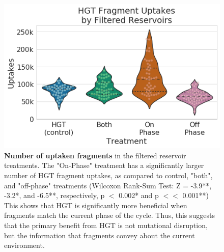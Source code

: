 \documentclass[PhD]{msu-thesis}
\begin{document}
	\begin{figure}[h!]
	\begin{center}
	\includegraphics[width=0.75\columnwidth]{figures/HGT/hgt_use_by_cycle_phase_source.png}
	\caption{\textbf{Number of uptaken fragments} in the filtered reservoir treatments. The "On-Phase" treatment has a significantly larger number of HGT fragment uptakes, as compared to control, "both", and "off-phase" treatments (Wilcoxon Rank-Sum Test: Z = -3.9**, -3.2*, and -6.5**, respectively, p $<$ 0.002* and p $<<$ 0.001**) This shows that HGT is significantly more beneficial when fragments match the current phase of the cycle. Thus, this suggests that the primary benefit from HGT is not mutational disruption, but the information that fragments convey about the current environment.
	}\label{fig:hgt_use_by_cycle_phase_source}
	\end{center}
	\end{figure}


\end{document}
